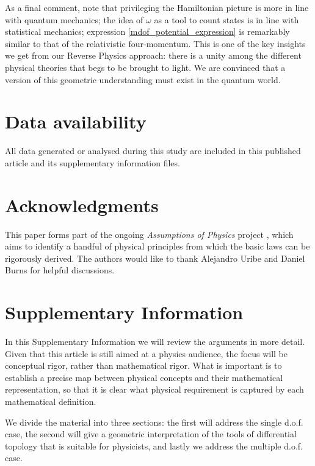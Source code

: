 \documentclass[fleqn,10pt]{wlscirep}
\begin{document}
As a final comment, note that privileging the Hamiltonian picture is more in line with quantum mechanics; the idea of $\omega$ as a tool to count states is in line with statistical mechanics; expression \ref{mdof_potential_expression} is remarkably similar to that of the relativistic four-momentum. This is one of the key insights we get from our Reverse Physics approach: there is a unity among the different physical theories that begs to be brought to light. We are convinced that a version of this geometric understanding must exist in the quantum world.

\vspace{-1mm}
\section*{Data availability}
All data generated or analysed during this study are included in this published article and its supplementary information files.

\vspace{-1mm}
\section*{Acknowledgments}
This paper forms part of the ongoing \textit{Assumptions of Physics} project \cite{aop-book}, which aims to identify a handful of physical principles from which the basic laws can be rigorously derived. The authors would like to thank Alejandro Uribe and Daniel Burns for helpful discussions. 



\newpage
\section*{Supplementary Information}
\setcounter{page}{1}

In this Supplementary Information we will review the arguments in more detail. Given that this article is still aimed at a physics audience, the focus will be conceptual rigor, rather than mathematical rigor. What is important is to establish a precise map between physical concepts and their mathematical representation, so that it is clear what physical requirement is captured by each mathematical definition.

We divide the material into three sections: the first will address the single d.o.f. case, the second will give a geometric interpretation of the tools of differential topology that is suitable for physicists, and lastly we address the multiple d.o.f. case.
\end{document}
